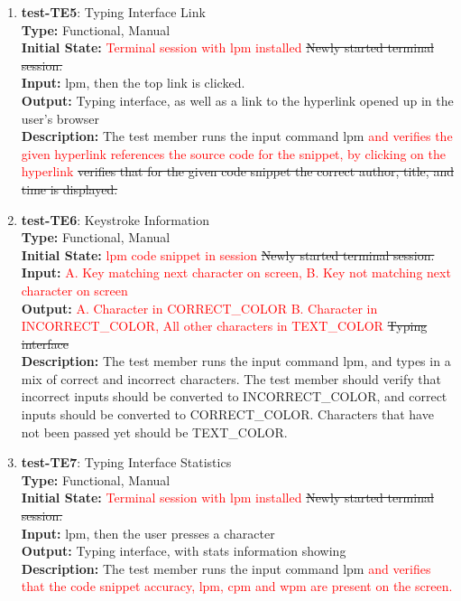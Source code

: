 \documentclass[12pt, titlepage]{article}
\begin{document}
\begin{enumerate}
\item{\textbf{test-TE5}: Typing Interface Link\\}
\textbf{Type:} Functional, Manual \\
\textbf{Initial State:} \textcolor{red}{Terminal session with lpm installed} \sout{Newly started terminal session.} \\
\textbf{Input:} lpm, then the top link is clicked. \\
\textbf{Output:}  Typing interface, as well as a link to the hyperlink opened up in the user's browser \\
\textbf{Description:} The test member runs the input command lpm \textcolor{red}{and verifies the given hyperlink references the source code for the snippet, by clicking on the hyperlink} \sout{verifies that for the given code snippet the correct author, title, and time is displayed.} \\

\item{\textbf{test-TE6}: Keystroke Information\\}
\textbf{Type:} Functional, Manual \\
\textbf{Initial State:} \textcolor{red}{lpm code snippet in session} \sout{Newly started terminal session.} \\
\textbf{Input:} \textcolor{red}{A. Key matching next character on screen, B. Key not matching next character on screen}\\
\textbf{Output:} \textcolor{red}{A. Character in CORRECT\_COLOR B. Character in INCORRECT\_COLOR, All other characters in TEXT\_COLOR} \sout{Typing interface}  \\
\textbf{Description:} The test member runs the input command lpm, and types in a mix of correct and incorrect characters. The test member should verify that incorrect inputs should be converted to INCORRECT\_COLOR, and correct inputs should be converted to CORRECT\_COLOR. Characters that have not been passed yet should be TEXT\_COLOR. \\

\item{\textbf{test-TE7}: Typing Interface Statistics\\}
\textbf{Type:} Functional, Manual \\
\textbf{Initial State:} \textcolor{red}{Terminal session with lpm installed} \sout{Newly started terminal session.} \\
\textbf{Input:} lpm, then the user presses a character \\
\textbf{Output:} Typing interface, with stats information showing \\
\textbf{Description:} The test member runs the input command lpm \textcolor{red}{and verifies that the code snippet accuracy, lpm, cpm and wpm are present on the screen.} \\


\end{enumerate}
\end{document}
